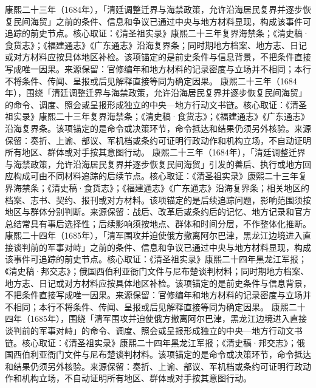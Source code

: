 康熙二十三年（1684年），「清廷调整迁界与海禁政策，允许沿海居民复界并逐步恢复民间海贸」之前的条件、信息和争议已通过中央与地方材料显现，构成该事件可追踪的前史节点。核心取证：《清圣祖实录》康熙二十三年复界海禁条；《清史稿·食货志》；《福建通志》《广东通志》沿海复界条；同时期地方档案、地方志、日记或对方材料应按具体地区补检。该项锚定的是前史条件与信息背景，不把条件直接写成唯一因果。来源保留：官修编年和地方材料的记录密度与立场并不相同；本行不将条件、传闻、呈报或后见解释直接等同为确定因果。
康熙二十三年（1684年），围绕「清廷调整迁界与海禁政策，允许沿海居民复界并逐步恢复民间海贸」的命令、调度、照会或呈报形成独立的中央—地方行动文书链。核心取证：《清圣祖实录》康熙二十三年复界海禁条；《清史稿·食货志》；《福建通志》《广东通志》沿海复界条。该项锚定的是命令或决策环节，命令抵达和结果仍须另外核验。来源保留：奏折、上谕、部议、军机档或条约可证明行政动作和机构立场，不自动证明所有地区、群体或对手按其意图行动。
康熙二十三年（1684年），「清廷调整迁界与海禁政策，允许沿海居民复界并逐步恢复民间海贸」引发的善后、执行或地方回应构成可由不同材料追踪的后续节点。核心取证：《清圣祖实录》康熙二十三年复界海禁条；《清史稿·食货志》；《福建通志》《广东通志》沿海复界条；相关地区的档案、志书、契约、报刊或对方材料。该项锚定的是后续追踪问题，影响范围须按地区与群体分别判断。来源保留：战后、改革后或条约后的记忆、地方记录和官方总结常具有事后选择性；后续影响须按地点、群体和时间分层，不作整体化推断。
康熙二十四年（1685年），「清军围攻并迫使俄方撤离阿尔巴津，黑龙江边境进入直接谈判前的军事对峙」之前的条件、信息和争议已通过中央与地方材料显现，构成该事件可追踪的前史节点。核心取证：《清圣祖实录》康熙二十四年黑龙江军报；《清史稿·邦交志》；俄国西伯利亚衙门文件与尼布楚谈判材料；同时期地方档案、地方志、日记或对方材料应按具体地区补检。该项锚定的是前史条件与信息背景，不把条件直接写成唯一因果。来源保留：官修编年和地方材料的记录密度与立场并不相同；本行不将条件、传闻、呈报或后见解释直接等同为确定因果。
康熙二十四年（1685年），围绕「清军围攻并迫使俄方撤离阿尔巴津，黑龙江边境进入直接谈判前的军事对峙」的命令、调度、照会或呈报形成独立的中央—地方行动文书链。核心取证：《清圣祖实录》康熙二十四年黑龙江军报；《清史稿·邦交志》；俄国西伯利亚衙门文件与尼布楚谈判材料。该项锚定的是命令或决策环节，命令抵达和结果仍须另外核验。来源保留：奏折、上谕、部议、军机档或条约可证明行政动作和机构立场，不自动证明所有地区、群体或对手按其意图行动。
